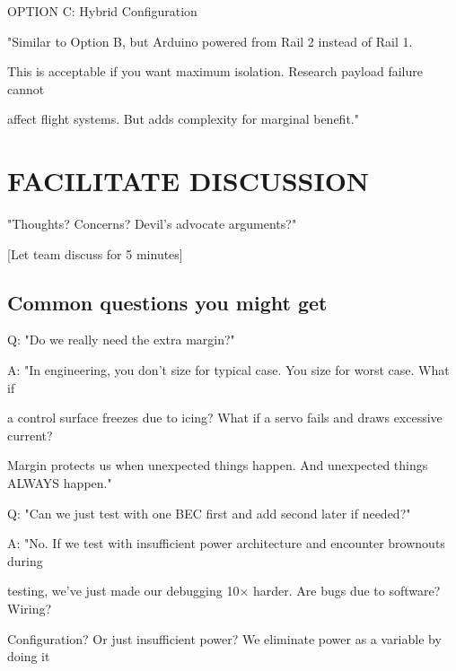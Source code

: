 \documentclass[11pt,letterpaper]{article}
\begin{document}
{OPTION C: Hybrid Configuration\par

"Similar to Option B, but Arduino powered from Rail 2 instead of Rail 1.\par

This is acceptable if you want maximum isolation. Research payload failure cannot\par

affect flight systems. But adds complexity for marginal benefit."\par

\section{FACILITATE DISCUSSION}

"Thoughts? Concerns? Devil's advocate arguments?"\par

[Let team discuss for 5 minutes]\par

\subsection{Common questions you might get}

Q: "Do we really need the extra margin?"\par

A: "In engineering, you don't size for typical case. You size for worst case. What if\par

a control surface freezes due to icing? What if a servo fails and draws excessive current?\par

Margin protects us when unexpected things happen. And unexpected things ALWAYS happen."\par

Q: "Can we just test with one BEC first and add second later if needed?"\par

A: "No. If we test with insufficient power architecture and encounter brownouts during\par

testing, we've just made our debugging 10$\times$ harder. Are bugs due to software? Wiring?\par

Configuration? Or just insufficient power? We eliminate power as a variable by doing it\par

}
\end{document}

